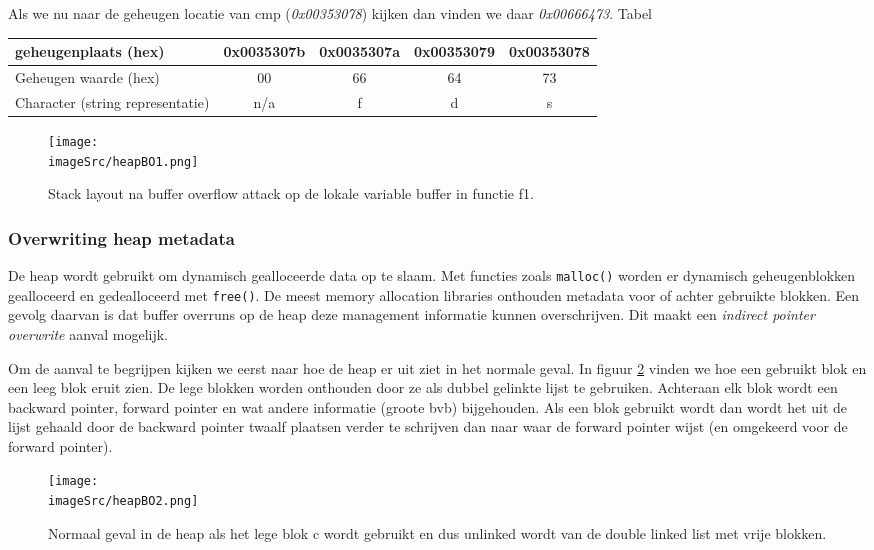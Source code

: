 \documentclass[../main.tex]{subfiles}
\begin{document}
Als we nu naar de geheugen locatie van cmp (\emph{0x00353078}) kijken dan vinden we daar \emph{0x00666473}.
Tabel
\begin{table}
\centering
\begin{tabular}{l|cccc|}
		geheugenplaats (hex) & 0x0035307b & 0x0035307a & 0x00353079 & 0x00353078 \\ \hline
		Geheugen waarde (hex) & 00 & 66 & 64 & 73 \\ \hline
		Character (string representatie) & n/a & f & d & s \\ \hline
\end{tabular}
\end{table}

\begin{figure}
\centering
\texttt{[image: \\imageSrc/heapBO1.png]}
\caption{Stack layout na buffer overflow attack op de lokale variable buffer in functie f1.}
\label{f:heapBO1}
\end{figure}

\subsubsection{Overwriting heap metadata}
De heap wordt gebruikt om dynamisch gealloceerde data op te slaam.
Met functies zoals \lstinline[style=ilcstyle]{malloc()} worden er dynamisch geheugenblokken gealloceerd en gedealloceerd met \lstinline[style=ilcstyle]{free()}.
De meest memory allocation libraries onthouden metadata voor of achter gebruikte blokken.
Een gevolg daarvan is dat buffer overruns op de heap deze management informatie kunnen overschrijven.
Dit maakt een \emph{indirect pointer overwrite} aanval mogelijk.

Om de aanval te begrijpen kijken we eerst naar hoe de heap er uit ziet in het normale geval.
In figuur \ref{f:heapBO2} vinden we hoe een gebruikt blok en een leeg blok eruit zien.
De lege blokken worden onthouden door ze als dubbel gelinkte lijst te gebruiken.
Achteraan elk blok wordt een backward pointer, forward pointer en wat andere informatie (groote bvb) bijgehouden.
Als een blok gebruikt wordt dan wordt het uit de lijst gehaald door de backward pointer twaalf plaatsen verder te schrijven dan naar waar de forward pointer wijst (en omgekeerd voor de forward pointer).

\begin{figure}
\centering
\texttt{[image: \\imageSrc/heapBO2.png]}
\caption{Normaal geval in de heap als het lege blok c wordt gebruikt en dus unlinked wordt van de double linked list met vrije blokken.}
\label{f:heapBO2}
\end{figure}
\end{document}

